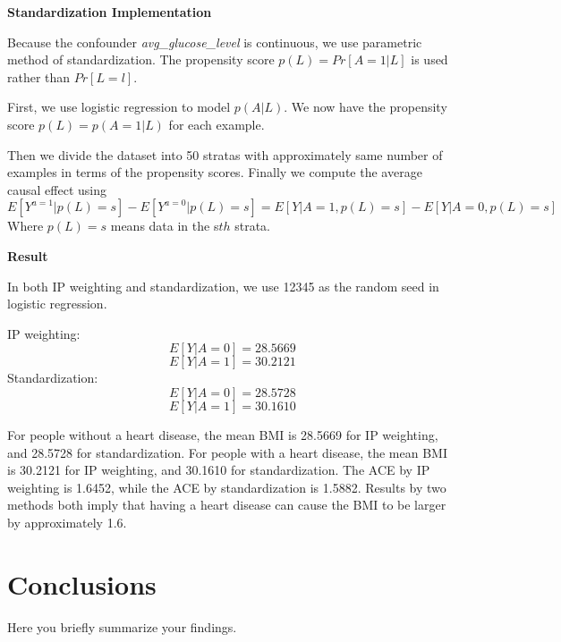 \documentclass[letterpaper,12pt]{article}
\begin{document}
\textbf{Standardization Implementation}\par

Because the confounder \emph{avg_glucose_level} is continuous, we use parametric method of standardization. The propensity score $p(L)=Pr[A=1|L]$ is used rather than $Pr[L=l]$.

First, we use logistic regression to model $p(A|L)$. We now have the propensity score $p(L)=p(A=1|L)$ for each example.

Then we divide the dataset into 50 stratas with approximately same number of examples in terms of the propensity scores.
Finally we compute the average causal effect using
$$E[Y^{a=1}|p(L)=s]-E[Y^{a=0}|p(L)=s]=E[Y|A=1,p(L)=s]-E[Y|A=0,p(L)=s]$$
Where $p(L)=s$ means data in the s$th$ strata.

\textbf{Result}\par

In both IP weighting and standardization, we use 12345 as the random seed in logistic regression.

IP weighting:
	$$E[Y|A=0]=28.5669$$
	$$E[Y|A=1]=30.2121$$
Standardization:
	$$E[Y|A=0]=28.5728$$
	$$E[Y|A=1]=30.1610$$

For people without a heart disease, the mean BMI is 28.5669 for IP weighting, and 28.5728 for standardization.
For people with a heart disease, the mean BMI is 30.2121 for IP weighting, and 30.1610 for standardization.
The ACE by IP weighting is 1.6452, while the ACE by standardization is 1.5882. Results by two methods both imply that having a heart disease can cause the BMI to be larger by approximately 1.6.


\section{Conclusions}
Here you briefly summarize your findings.






\newpage
\end{document}
